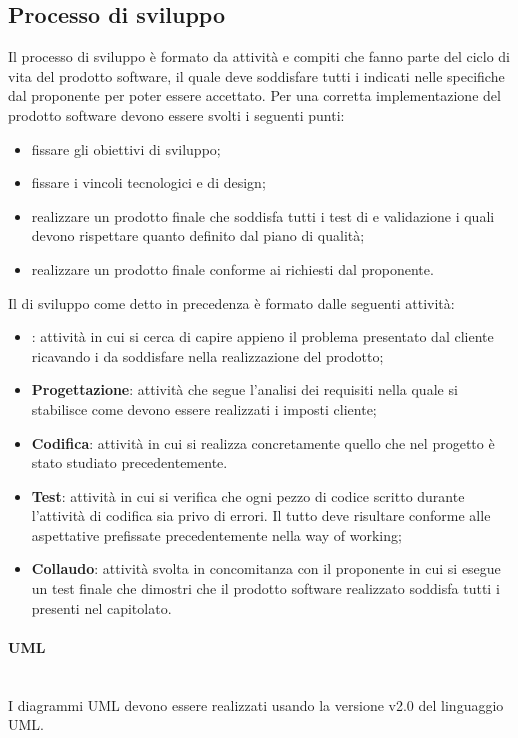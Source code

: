\subsection{Processo di sviluppo}
Il processo di sviluppo è formato da attività e compiti che fanno parte del ciclo di vita del prodotto software, il quale deve soddisfare tutti i  indicati nelle specifiche dal proponente per poter essere accettato.
Per una corretta implementazione del prodotto software devono essere svolti i seguenti punti: 
\begin{itemize}
	\item fissare gli obiettivi di sviluppo;
	\item fissare i vincoli tecnologici e di design;
	\item realizzare un prodotto finale che soddisfa tutti i test di  e validazione i quali devono rispettare quanto definito dal piano di qualità;
	\item realizzare un prodotto finale conforme ai  richiesti dal proponente.
\end{itemize}		
Il  di sviluppo come detto in precedenza è formato dalle seguenti attività:
\begin{itemize}
	\item \textbf{\AdR{}}: attività in cui si cerca di capire appieno il problema presentato dal cliente ricavando i  da soddisfare nella realizzazione del prodotto;
	\item \textbf{Progettazione}: attività che segue l'analisi dei requisiti nella quale si stabilisce come devono essere realizzati i  imposti cliente;
	\item \textbf{Codifica}: attività in cui si realizza concretamente quello che nel progetto è stato  studiato precedentemente.
	\item \textbf{Test}: attività in cui si verifica che ogni pezzo di codice scritto durante l'attività di codifica sia privo di errori. Il tutto deve risultare conforme alle aspettative prefissate precedentemente nella way of working;
\item \textbf{Collaudo}: attività svolta in concomitanza con il proponente in cui si esegue un test finale che dimostri che il prodotto software realizzato soddisfa tutti i  presenti nel capitolato.
\end{itemize}







\paragraph{UML}\mbox{}\\
I diagrammi UML devono essere realizzati usando la versione v2.0 del linguaggio UML.